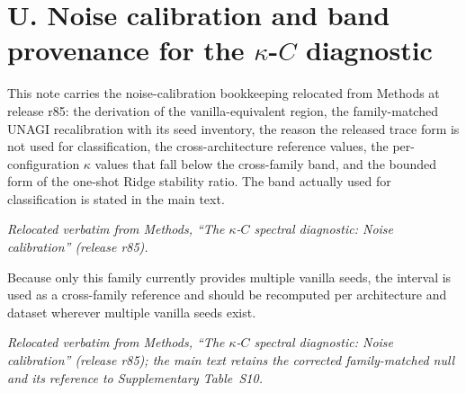 \documentclass[11 pt,a4 paper]{article}
\begin{document}
\clearpage

\section*{U. Noise calibration and band provenance for the $\kappa$-$C$ diagnostic}

This note carries the noise-calibration bookkeeping relocated from Methods at release r85: the derivation of the vanilla-equivalent region, the family-matched UNAGI recalibration with its seed inventory, the reason the released trace form is not used for classification, the cross-architecture reference values, the per-configuration $\kappa$ values that fall below the cross-family band, and the bounded form of the one-shot Ridge stability ratio. The band actually used for classification is stated in the main text.

\noindent\emph{Relocated verbatim from Methods, ``The $\kappa$-$C$ spectral diagnostic: Noise calibration'' (release r85).}

Because only this family currently provides multiple vanilla seeds, the interval is used as a cross-family reference and should be recomputed per architecture and dataset wherever multiple vanilla seeds exist.

\noindent\emph{Relocated verbatim from Methods, ``The $\kappa$-$C$ spectral diagnostic: Noise calibration'' (release r85); the main text retains the corrected family-matched null and its reference to Supplementary Table~S10.}
\end{document}
